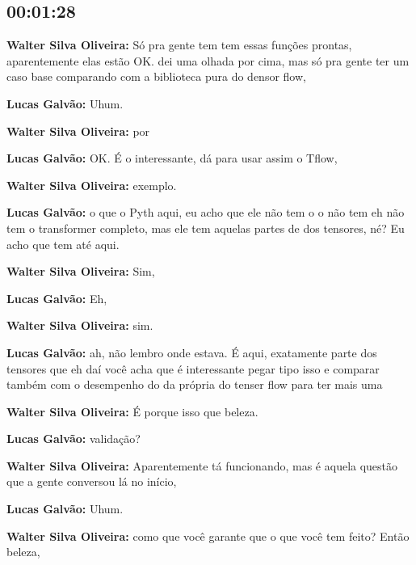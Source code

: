 \subsection{\textbf{00:01:28}}



\textbf{Walter Silva Oliveira:} Só pra gente tem tem essas funções prontas, aparentemente elas estão OK. dei uma olhada por cima, mas só pra gente ter um caso base comparando com a biblioteca pura do densor flow,



\textbf{Lucas Galvão:} Uhum.



\textbf{Walter Silva Oliveira:} por



\textbf{Lucas Galvão:} OK. É o interessante, dá para usar assim o Tflow,



\textbf{Walter Silva Oliveira:} exemplo.



\textbf{Lucas Galvão:} o que o Pyth aqui, eu acho que ele não tem o o não tem eh não tem o transformer completo, mas ele tem aquelas partes de dos tensores, né? Eu acho que tem até aqui.



\textbf{Walter Silva Oliveira:} Sim,



\textbf{Lucas Galvão:} Eh,



\textbf{Walter Silva Oliveira:} sim.



\textbf{Lucas Galvão:} ah, não lembro onde estava. É aqui, exatamente parte dos tensores que eh daí você acha que é interessante pegar tipo isso e comparar também com o desempenho do da própria do tenser flow para ter mais uma



\textbf{Walter Silva Oliveira:} É porque isso que beleza.



\textbf{Lucas Galvão:} validação?



\textbf{Walter Silva Oliveira:} Aparentemente tá funcionando, mas é aquela questão que a gente conversou lá no início,



\textbf{Lucas Galvão:} Uhum.



\textbf{Walter Silva Oliveira:} como que você garante que o que você tem feito? Então beleza,



